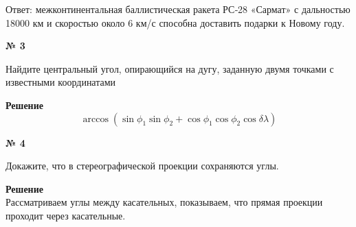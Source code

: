     Ответ: межконтинентальная баллистическая ракета РС‑28 «Сармат» с дальностью
    18000 км и скоростью около 6 км/с способна доставить подарки к Новому году.

    \begin{center}
        \textbf{№ 3}
    \end{center}

    Найдите центральный угол, опирающийся на дугу, заданную двумя точками с известными координатами

    \textbf{Решение}\\

    \[
        \arccos( \sin \phi_1 \sin \phi_2 + \cos\phi_1\cos\phi_2 \cos\delta\lambda)
    \]

    \begin{center}
        \textbf{№ 4}
    \end{center}

    Докажите, что в стереографической проекции сохраняются углы.

    \textbf{Решение}\\

    Рассматриваем углы между касательных, показываем, что прямая проекции проходит
    через касательные.

